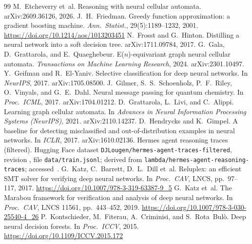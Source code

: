 \documentclass[10pt]{article}
\begin{document}
\begin{thebibliography}{99}
 M.~Etcheverry et~al. Reasoning with neural cellular automata. arXiv:2609.36126, 2026.
 J.~H.~Friedman. Greedy function approximation: a gradient boosting machine. \emph{Ann.\ Statist.}, 29(5):1189--1232, 2001. \url{https://doi.org/10.1214/aos/1013203451}
 N.~Frosst and G.~Hinton. Distilling a neural network into a soft decision tree. arXiv:1711.09784, 2017.
 G.~Gala, D.~Grattarola, and E.~Quaeghebeur. E($n$)-equivariant graph neural cellular automata. \emph{Transactions on Machine Learning Research}, 2024. arXiv:2301.10497.
 Y.~Geifman and R.~El-Yaniv. Selective classification for deep neural networks. In \emph{NeurIPS}, 2017. arXiv:1705.08500.
 J.~Gilmer, S.~S.~Schoenholz, P.~F.~Riley, O.~Vinyals, and G.~E.~Dahl. Neural message passing for quantum chemistry. In \emph{Proc.\ ICML}, 2017. arXiv:1704.01212.
 D.~Grattarola, L.~Livi, and C.~Alippi. Learning graph cellular automata. In \emph{Advances in Neural Information Processing Systems (NeurIPS)}, 2021. arXiv:2110.14237.
 D.~Hendrycks and K.~Gimpel. A baseline for detecting misclassified and out-of-distribution examples in neural networks. In \emph{ICLR}, 2017. arXiv:1610.02136.
 Hermes agent reasoning traces (filtered). Hugging Face dataset \texttt{DJLougen/hermes-agent-traces-filtered}, revision \texttt{\numHermesDatasetRevFull{}}, file \texttt{data/train.jsonl}; derived from \texttt{lambda/hermes-agent-reasoning-traces}; accessed~\numHermesDatasetAccess{}.
 G.~Katz, C.~Barrett, D.~L.~Dill et~al. Reluplex: an efficient SMT solver for verifying deep neural networks. In \emph{Proc.\ CAV}, LNCS, pp.~97--117, 2017. \url{https://doi.org/10.1007/978-3-319-63387-9_5}
 G.~Katz et~al. The Marabou framework for verification and analysis of deep neural networks. In \emph{Proc.\ CAV}, LNCS 11561, pp.~443--452, 2019. \url{https://doi.org/10.1007/978-3-030-25540-4_26}
 P.~Kontschieder, M.~Fiterau, A.~Criminisi, and S.~Rota~Bul\`o. Deep neural decision forests. In \emph{Proc.\ ICCV}, 2015. \url{https://doi.org/10.1109/ICCV.2015.172}

\end{thebibliography}
\end{document}

